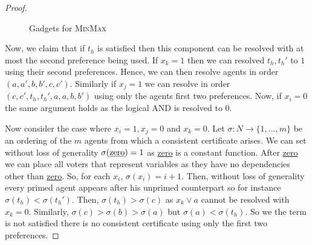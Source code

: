 \documentclass[11pt,a4paper, titlepage]{article}
\theoremstyle{definition}
\begin{document}
\begin{proof}
\begin{figure}[h]
{{
    }}
    \caption{Gadgets for \textsc{MinMax}}
    \end{figure}

    Now, we claim that if $t_h$ is satisfied then this component can be resolved with at most the second preference being used. If $x_k = 1$ then we can resolved $t_h, t_h'$ to $1$ using their second preferences. Hence, we can then resolve agents in order $(a, a', b, b', c, c')$. Similarly if $x_j = 1$ we can resolve in order $(c, c', t_h, t_h', a, a, b, b')$ using only the agents first two preferences. Now, if $x_i = 0$ the same argument holds as the logical AND is resolved to 0. 

    Now consider the case where $x_i = 1, x_j = 0$ and $x_k = 0$. Let $\sigma \colon N \longrightarrow \{1,..., m\}$ be an ordering of the $m$ agents from which a consistent certificate arises. 
    We can set without loss of generality $\sigma(\text{\underline{zero}}) = 1$ as \underline{zero} is a constant function. 
    After \underline{zero} we can place all voters that represent variables as they have no dependencies other than \underline{zero}. 
    So, for each $x_i$, $\sigma(x_i) = i + 1$. 
    Then, without loss of generality every primed agent appears after his unprimed counterpart so for instance $\sigma(t_h) < \sigma(t_h')$. 
    Then, $\sigma(t_h) > \sigma(c)$ as $x_k \lor a$ cannot be resolved with $x_k = 0$. 
    Similarly, $\sigma(c) > \sigma(b) > \sigma(a)$ but $\sigma(a) < \sigma(t_h)$. 
    So we the term is not satisfied there is no consistent certificate using only the first two preferences.


\end{proof}
\end{document}
